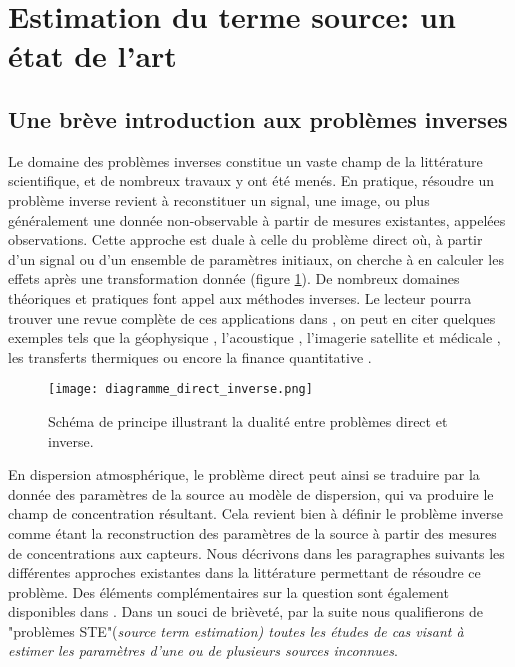 		
	\section{Estimation du terme source: un état de l'art}
	\label{section_etat_art_STE}
	
	\subsection{Une brève introduction aux problèmes inverses}
	Le domaine des problèmes inverses constitue un vaste champ de la littérature scientifique, et de nombreux travaux y ont été menés. En pratique, résoudre un problème inverse revient à reconstituer un signal, une image, ou plus généralement une donnée non-observable à partir de mesures existantes, appelées observations.
	Cette approche est duale à celle du problème direct où, à partir d'un signal ou d'un ensemble de paramètres initiaux, on cherche à en calculer les effets après une transformation donnée (figure \ref{fig_diagramme_direct_inverse}).
	De nombreux domaines théoriques et pratiques font appel aux méthodes inverses. Le lecteur pourra trouver une revue complète de ces applications dans \cite{Tarantola2004}, on peut en citer quelques exemples tels que la géophysique \cite{Backus1967}, l'acoustique \cite{Kirsch1988}, l'imagerie satellite \cite{Park2003} et médicale \cite{Arridge1999}, les transferts thermiques \cite{McCormik1992} ou encore la finance quantitative \cite{Dembo1999}.\\
	
	\begin{figure}
		\centering
		\texttt{[image: diagramme\_direct\_inverse.png]}
		\caption{Schéma de principe illustrant la dualité entre problèmes direct et inverse.}
		\label{fig_diagramme_direct_inverse}
	\end{figure}
	
	
	En dispersion atmosphérique, le problème direct peut ainsi se traduire par la donnée des paramètres de la source au modèle de dispersion, qui va produire le champ de concentration résultant. Cela revient bien à définir le problème inverse comme étant la reconstruction des paramètres de la source à partir des mesures de concentrations aux capteurs. Nous décrivons dans les paragraphes suivants les différentes approches existantes dans la littérature permettant de résoudre ce problème. Des éléments complémentaires sur la question sont également disponibles dans \cite{Rao2007}. Dans un souci de brièveté, par la suite nous qualifierons de "problèmes STE"(\textit{source term estimation) toutes les études de cas visant à estimer les paramètres d'une ou de plusieurs sources inconnues}.\\
	

